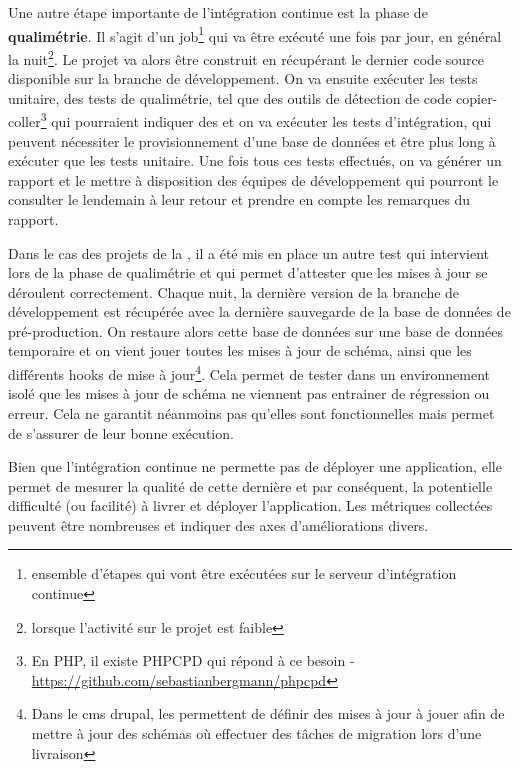 Une autre étape importante de l'intégration continue est la phase de \textbf{qualimétrie}. Il s'agit d'un job\footnote{ensemble d'étapes qui vont être exécutées sur le serveur d'intégration continue} qui va être exécuté une fois par jour, en général la nuit\footnote{lorsque l'activité sur le projet est faible}. Le projet va alors être construit en récupérant le dernier code source disponible sur la branche de développement. On va ensuite exécuter les tests unitaire, des tests de qualimétrie, tel que des outils de détection de code  copier-coller\footnote{En \gls{PHP}, il existe PHPCPD qui répond à ce besoin - \url{https://github.com/sebastianbergmann/phpcpd}} qui pourraient indiquer des  et on va exécuter les tests d'intégration, qui peuvent nécessiter le provisionnement d'une base de données et être plus long à exécuter que les tests unitaire. Une fois tous ces tests effectués, on va générer un rapport et le mettre à disposition des équipes de développement qui pourront le consulter le lendemain à leur retour et prendre en compte les remarques du rapport. 

Dans le cas des projets de la \naq{}, il a été mis en place un autre test qui intervient lors de la phase de qualimétrie et qui permet d'attester que les mises à jour se déroulent correctement. Chaque nuit, la dernière version de la branche de développement est récupérée avec la dernière sauvegarde de la base de données de pré-production. On restaure alors cette base de données sur une base de données temporaire et on vient jouer toutes les mises à jour de schéma, ainsi que les différents hooks de mise à jour\footnote{Dans le \gls{cms} \gls{drupal}, les  permettent de définir des mises à jour à jouer afin de mettre à jour des schémas où effectuer des tâches de migration lors d'une livraison}. Cela permet de tester dans un environnement isolé que les mises à jour de schéma ne viennent pas entrainer de régression ou erreur. Cela ne garantit néanmoins pas qu'elles sont fonctionnelles mais permet de s'assurer de leur bonne exécution.

Bien que l'intégration continue ne permette pas de déployer une application, elle permet de mesurer la qualité de cette dernière et par conséquent, la potentielle difficulté (ou facilité) à livrer et déployer l'application. Les métriques collectées peuvent être nombreuses et indiquer des axes d'améliorations divers.

